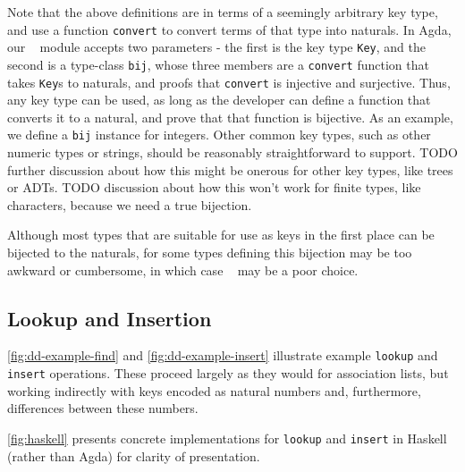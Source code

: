 

Note that the above definitions are in terms of a seemingly arbitrary key type,
and use a function \texttt{convert} to convert terms of that type into naturals.
In Agda, our \dd~ module accepts two parameters - the first is the key type \texttt{Key},
and the second is a type-class \texttt{bij}, whose three members are a \texttt{convert}
function that takes \texttt{Key}s to naturals, and proofs that \texttt{convert} is
injective and surjective. Thus, any key type can be used, as long as the developer
can define a function that converts it to a natural, and prove that that function is
bijective. As an example, we define a \texttt{bij} instance for integers. Other common
key types, such as other numeric types or strings, should be reasonably straightforward
to support. TODO further discussion about how this might be onerous for other key types,
like trees or ADTs. TODO discussion about how this won't work for finite types, like
characters, because we need a true bijection.

Although most types that are suitable for use as keys in the first place can be bijected to the
naturals, for some types defining this bijection may be too awkward or cumbersome, in which case \dds~ may
be a poor choice.

\subsection{Lookup and Insertion}
\label{sec:DD:basics}



\autoref{fig:dd-example-find} and \autoref{fig:dd-example-insert} illustrate example \texttt{lookup} and \texttt{insert} operations.
%
These proceed largely as they would for association lists, but working indirectly with keys encoded as natural numbers and, furthermore, differences between these numbers.

\autoref{fig:haskell} presents concrete implementations for \texttt{lookup} and \texttt{insert} in Haskell (rather than Agda) for clarity of presentation.
%

